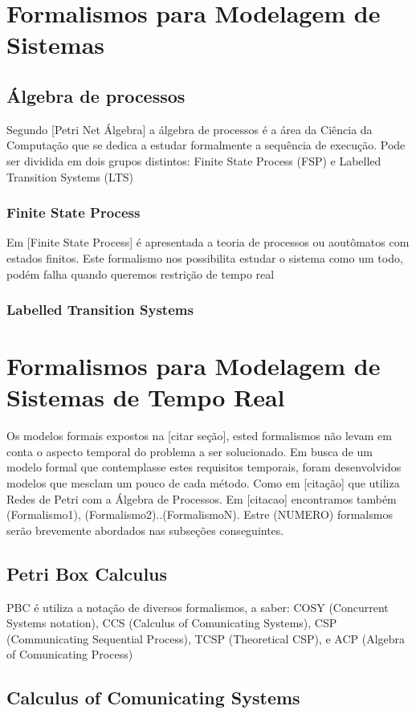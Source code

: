 \section{Formalismos para Modelagem de Sistemas}
\subsection{Álgebra de processos}
Segundo [Petri Net Álgebra] a álgebra de processos é a área da Ciência da Computação que se dedica
a estudar formalmente a sequência de execução. Pode ser dividida em dois
grupos distintos: Finite State Process (FSP) e Labelled Transition Systems (LTS)
\subsubsection{Finite State Process}
Em [Finite State Process] é apresentada a teoria de processos ou aoutômatos com estados finitos.
Este formalismo nos possibilita estudar o sistema como um todo, podém falha quando queremos restrição de tempo real
\subsubsection{Labelled Transition Systems}

\section{Formalismos para Modelagem de Sistemas de Tempo Real}
Os modelos formais expostos na [citar seção], ested formalismos não levam em conta o aspecto temporal do problema
a ser solucionado.
Em busca de um modelo formal que contemplasse estes requisitos temporais, foram desenvolvidos modelos que mesclam
um pouco de cada método. Como em [citação] que utiliza Redes de Petri com a Álgebra de Processos. Em [citacao]
encontramos também (Formalismo1), (Formalismo2)..(FormalismoN).
Estre (NUMERO) formalsmos serão brevemente abordados nas subseções conseguintes.
\subsection{Petri Box Calculus}
PBC é utiliza a notação de diversos formalismos, a saber: COSY (Concurrent Systems notation), CCS (Calculus of Comunicating Systems), CSP (Communicating Sequential Process), TCSP (Theoretical CSP), e ACP (Algebra of Comunicating Process)

\lipsum[1]
\subsection{Calculus of Comunicating Systems}
\lipsum[1]
